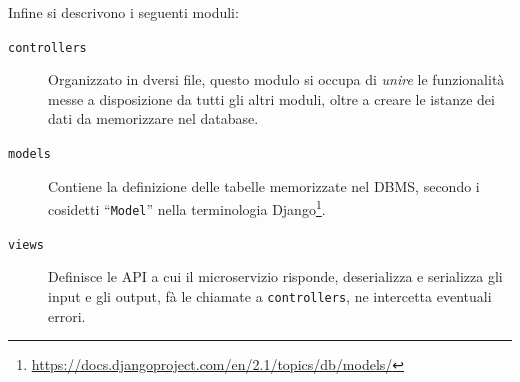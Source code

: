 Infine si descrivono i seguenti moduli:
\begin{description}
  \item[\texttt{controllers}]Organizzato in dversi file, questo modulo si occupa di
  \textit{unire} le funzionalità messe a disposizione da tutti gli altri moduli,
  oltre a creare le istanze dei dati da memorizzare nel database.
  \item[\texttt{models}]Contiene la definizione delle tabelle memorizzate nel DBMS, secondo
  i cosidetti ``\texttt{Model}'' nella terminologia
  Django\footnote{\url{https://docs.djangoproject.com/en/2.1/topics/db/models/}}.
  \item[\texttt{views}]Definisce le API a cui il microservizio risponde, deserializza e serializza
  gli input e gli output, fà le chiamate a \texttt{controllers}, ne intercetta eventuali errori.
\end{description}